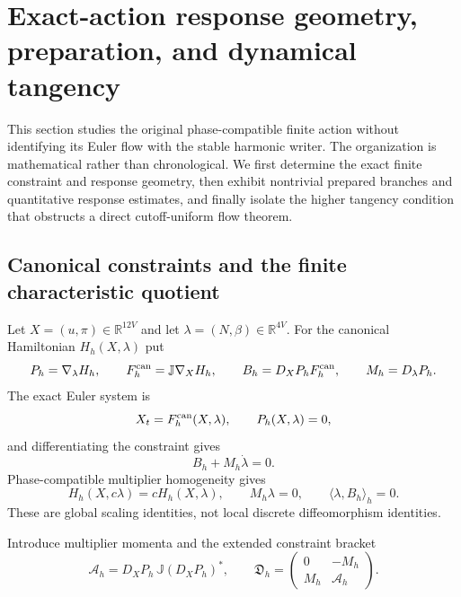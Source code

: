 \documentclass[11pt]{article}
\theoremstyle{definition}
\theoremstyle{remark}
\begin{document}
\section{Exact-action response geometry, preparation, and dynamical tangency}
\label{supp:exact-action-audit}

This section studies the original phase-compatible finite action without
identifying its Euler flow with the stable harmonic writer.  The organization
is mathematical rather than chronological.  We first determine the exact
finite constraint and response geometry, then exhibit nontrivial prepared
branches and quantitative response estimates, and finally isolate the higher
tangency condition that obstructs a direct cutoff-uniform flow theorem.

\subsection{Canonical constraints and the finite characteristic quotient}

Let $X=(u,\pi)\in\mathbb R^{12V}$ and let
$\lambda=(N,\beta)\in\mathbb R^{4V}$.  For the canonical Hamiltonian
$H_h(X,\lambda)$ put
\begin{equation}
 P_h=\nabla_\lambda H_h,\qquad
 F_h^{\rm can}=\mathbb J\nabla_XH_h,\qquad
 B_h=D_XP_hF_h^{\rm can},\qquad M_h=D_\lambda P_h.
 \label{eq:supp-exact-canonical-objects}
\end{equation}
The exact Euler system is
\begin{equation}
 X_t=F_h^{\rm can}(X,\lambda),\qquad P_h(X,\lambda)=0,
 \label{eq:supp-exact-euler}
\end{equation}
and differentiating the constraint gives
\begin{equation}
 B_h+M_h\dot\lambda=0.
 \label{eq:supp-exact-first-consistency}
\end{equation}
Phase-compatible multiplier homogeneity gives
\begin{equation}
 H_h(X,c\lambda)=cH_h(X,\lambda),\qquad
 M_h\lambda=0,
 \qquad \langle\lambda,B_h\rangle_h=0.
 \label{eq:supp-exact-homogeneity}
\end{equation}
These are global scaling identities, not local discrete diffeomorphism
identities.

Introduce multiplier momenta and the extended constraint bracket
\begin{equation}
 \mathcal A_h=D_XP_h\,\mathbb J(D_XP_h)^*,\qquad
 \mathfrak D_h=\begin{pmatrix}0&-M_h\\M_h&\mathcal A_h\end{pmatrix}.
 \label{eq:supp-exact-dirac-matrix}
\end{equation}
\end{document}
